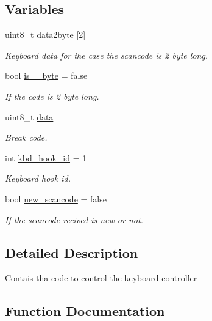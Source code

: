\subsection*{Variables}
\begin{DoxyCompactItemize}
\item 
uint8\+\_\+t \hyperlink{group__keyboard_ga1fab7e7fd2c88555db9e3dd5c3654ad3}{data2byte} \mbox{[}2\mbox{]}
\begin{DoxyCompactList}\small\item\em Keyboard data for the case the scancode is 2 byte long. \end{DoxyCompactList}\item 
bool \hyperlink{group__keyboard_ga7276dae9c8b623a99137f24b3b6b549e}{is\+\_\+\_\+byte} = false
\begin{DoxyCompactList}\small\item\em If the code is 2 byte long. \end{DoxyCompactList}\item 
uint8\+\_\+t \hyperlink{group__keyboard_ga325819a8e492ac69542e8b31705af6e9}{data}
\begin{DoxyCompactList}\small\item\em Break code. \end{DoxyCompactList}\item 
int \hyperlink{group__keyboard_ga74708534432e98d4ab30ba40e2e5dcc3}{kbd\+\_\+hook\+\_\+id} = 1
\begin{DoxyCompactList}\small\item\em Keyboard hook id. \end{DoxyCompactList}\item 
bool \hyperlink{group__keyboard_ga96f7c2f0fe863bd78294a8f639e60478}{new\+\_\+scancode} = false
\begin{DoxyCompactList}\small\item\em If the scancode recived is new or not. \end{DoxyCompactList}\end{DoxyCompactItemize}


\subsection{Detailed Description}
Contais tha code to control the keyboard controller 

\subsection{Function Documentation}
\mbox{\label{group__keyboard_ga0f2b9c07b7d16125c5fb2e05d9427e76}} 
